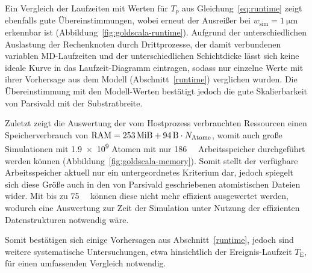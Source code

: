 Ein Vergleich der Laufzeiten mit Werten für $T_p$ aus Gleichung~\ref{eq:runtime} zeigt ebenfalls gute Übereinstimmungen, wobei erneut der Ausreißer bei $w_\text{sim} = \SI{1}{\micro\meter}$ erkennbar ist (Abbildung~\ref{fig:goldscala-runtime}). %
Aufgrund der unterschiedlichen Auslastung der Rechenknoten durch Drittprozesse, der damit verbundenen variablen MD-Laufzeiten und der unterschiedlichen Schichtdicke lässt sich keine ideale Kurve in das Laufzeit-Diagramm eintragen, sodass nur einzelne Werte mit ihrer Vorhersage aus dem Modell (Abschnitt~\ref{runtime}) verglichen wurden.
Die Übereinstimmung mit den Modell-Werten bestätigt jedoch die gute Skalierbarkeit von Parsivald mit der Substratbreite.

Zuletzt zeigt die Auswertung der vom Hostprozess verbrauchten Ressourcen einen Speicherverbrauch von $\text{RAM} = \SI{253}{\mebi\byte} + \SI{94}{\byte} \cdot N_\text{Atome}$, womit auch große Simulationen mit \num{1.9e9} Atomen mit nur \SI{186}{\gibi\byte} Arbeitsspeicher durchgeführt werden können (Abbildung~\ref{fig:goldscala-memory}).
Somit stellt der verfügbare Arbeitsspeicher aktuell nur ein untergeordnetes Kriterium dar, jedoch spiegelt sich diese Größe auch in den von Parsivald geschriebenen atomistischen Dateien wider.
Mit bis zu \SI{75}{\gibi\byte} können diese nicht mehr effizient ausgewertet werden, wodurch eine Auswertung zur Zeit der Simulation unter Nutzung der effizienten Datenstrukturen notwendig wäre.

Somit bestätigen sich einige Vorhersagen aus Abschnitt~\ref{runtime}, jedoch sind weitere systematische Untersuchungen, etwa hinsichtlich der Ereignis-Laufzeit $T_\text{E}$, für einen umfassenden Vergleich notwendig.

